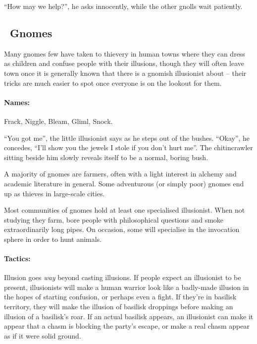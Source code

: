 \begin{multicols}{2}
\begin{boxtext}
  ``How may we help?'', he asks innocently, while the other gnolls wait patiently.

\end{boxtext}

\subsection[Gnomes]{\Gn\ Gnomes}
\label{best_gnomes}

Many gnomes few have taken to thievery in human towns where they can dress as children and confuse people with their illusions, though they will often leave town once it is generally known that there is a gnomish illusionist about -- their tricks are much easier to spot once everyone is on the lookout for them.

\paragraph{Names:} Frack, Niggle, Bleam, Gliml, Snock.

\begin{boxtext}

  ``You got me'', the little illusionist says as he steps out of the bushes.
  ``Okay'', he concedes, ``I'll show you the jewels I stole if you don't hurt me''.
  The chitincrawler sitting beside him slowly reveals itself to be a normal, boring bush.

\end{boxtext}

\label{gnomish_citizen}

A majority of gnomes are farmers, often with a light interest in alchemy and academic literature in general.  Some adventurous (or simply poor) gnomes end up as thieves in large-scale cities.


\label{gnomish_illusionist}

Most communities of gnomes hold at least one specialised illusionist.  When not studying they farm, bore people with philosophical questions and smoke extraordinarily long pipes.  On occasion, some will specialise in the invocation sphere in order to hunt animals.


\paragraph{Tactics:} Illusion goes \emph{way} beyond casting illusions.
If people expect an illusionist to be present, illusionists will make a human warrior look like a badly-made illusion in the hopes of starting confusion, or perhaps even a fight.
If they're in basilisk territory, they will make the illusion of basilisk droppings before making an illusion of a basilisk's roar.
If an actual basilisk appears, an illusionist can make it appear that a chasm is blocking the party's escape, or make a real chasm appear as if it were solid ground.


\end{multicols}
